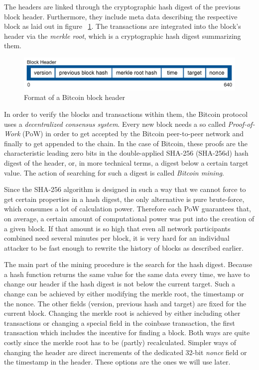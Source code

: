 The headers are linked through the cryptographic hash digest of the previous block header.
Furthermore, they include meta data describing the respective block as laid out in figure~ \ref{fig:headerformat}.
The transactions are integrated into the block's header via the \emph{merkle root}, which is a cryptographic hash digest summarizing them.

\begin{figure}[h]
	\centering
	\includegraphics[width=\textwidth]{img/block-header-format.png}
	\caption[Bitcoin block header format]{Format of a Bitcoin block header}
	\label{fig:headerformat}
\end{figure}

In order to verify the blocks and transactions within them, the Bitcoin protocol uses a \emph{decentralized consensus system}. 
Every new block needs a so called \emph{Proof-of-Work} (PoW) in order to get accepted by the Bitcoin peer-to-peer network and finally to get appended to the chain.
In the case of Bitcoin, these proofs are the characteristic leading zero bits in the double-applied SHA-256 (SHA-256d) hash digest of the header, or, in more technical terms, a digest below a certain target value.
The action of searching for such a digest is called \emph{Bitcoin mining}.

Since the SHA-256 algorithm is designed in such a way that we cannot force to get certain properties in a hash digest, the only alternative is pure brute-force, which consumes a lot of calculation power. 
Therefore each PoW guarantees that, on average, a certain amount of computational power was put into the creation of a given block. 
If that amount is so high that even all network participants combined need several minutes per block, it is very hard for an individual attacker to be fast enough to rewrite the history of blocks as described earlier. 

The main part of the mining procedure is the search for the hash digest.
Because a hash function returns the same value for the same data every time, we have to change our header if the hash digest is not below the current target.
Such a change can be achieved by either modifying the merkle root, the timestamp or the nonce. The other fields (version, previous hash and target) are fixed for the current block.
Changing the merkle root is achieved by either including other transactions or changing a special field in the coinbase transaction, the first transaction which includes the incentive for finding a block. 
Both ways are quite costly since the merkle root has to be (partly) recalculated. 
Simpler ways of changing the header are direct increments of the dedicated 32-bit \emph{nonce} field or the timestamp in the header.
These options are the ones we will use later.

